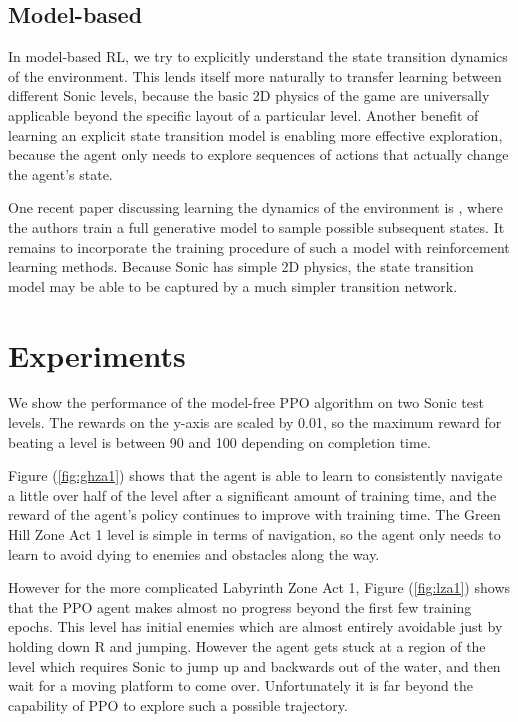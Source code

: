 \documentclass{article}
\begin{document}
\subsection{Model-based}

In model-based RL, we try to explicitly understand the state transition dynamics of the environment. This lends itself more naturally to transfer learning between different Sonic levels, because the basic 2D physics of the game are universally applicable beyond the specific layout of a particular level. Another benefit of learning an explicit state transition model is enabling more effective exploration, because the agent only needs to explore sequences of actions that actually change the agent's state. 

One recent paper discussing learning the dynamics of the environment is \citep{Ha2018WorldModels}, where the authors train a full generative model to sample possible subsequent states. It remains to incorporate the training procedure of such a model with reinforcement learning methods. Because Sonic has simple 2D physics, the state transition model may be able to be captured by a much simpler transition network. 

\section{Experiments}

We show the performance of the model-free PPO algorithm on two Sonic test levels. The rewards on the y-axis are scaled by 0.01, so the maximum reward for beating a level is between 90 and 100 depending on completion time.

Figure (\ref{fig:ghza1}) shows that the agent is able to learn to consistently navigate a little over half of the level after a significant amount of training time, and the reward of the agent's policy continues to improve with training time. The Green Hill Zone Act 1 level is simple in terms of navigation, so the agent only needs to learn to avoid dying to enemies and obstacles along the way.

However for the more complicated Labyrinth Zone Act 1, Figure (\ref{fig:lza1}) shows that the PPO agent makes almost no progress beyond the first few training epochs. This level has initial enemies which are almost entirely avoidable just by holding down R and jumping. However the agent gets stuck at a region of the level which requires Sonic to jump up and backwards out of the water, and then wait for a moving platform to come over. Unfortunately it is far beyond the capability of PPO to explore such a possible trajectory. 
\end{document}
